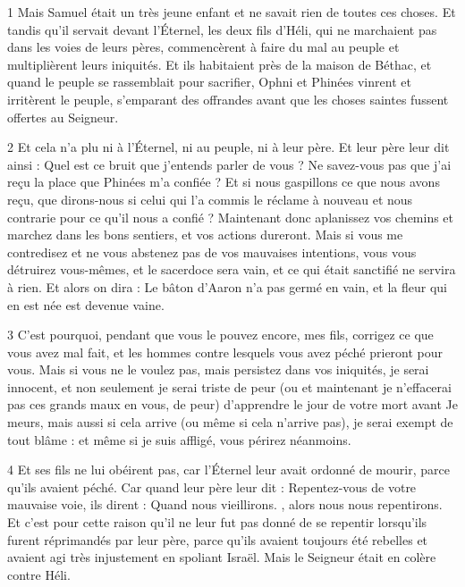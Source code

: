 
\par 1 Mais Samuel était un très jeune enfant et ne savait rien de toutes ces choses. Et tandis qu'il servait devant l'Éternel, les deux fils d'Héli, qui ne marchaient pas dans les voies de leurs pères, commencèrent à faire du mal au peuple et multiplièrent leurs iniquités. Et ils habitaient près de la maison de Béthac, et quand le peuple se rassemblait pour sacrifier, Ophni et Phinées vinrent et irritèrent le peuple, s'emparant des offrandes avant que les choses saintes fussent offertes au Seigneur.

\par 2 Et cela n'a plu ni à l'Éternel, ni au peuple, ni à leur père. Et leur père leur dit ainsi : Quel est ce bruit que j'entends parler de vous ? Ne savez-vous pas que j'ai reçu la place que Phinées m'a confiée ? Et si nous gaspillons ce que nous avons reçu, que dirons-nous si celui qui l'a commis le réclame à nouveau et nous contrarie pour ce qu'il nous a confié ? Maintenant donc aplanissez vos chemins et marchez dans les bons sentiers, et vos actions dureront. Mais si vous me contredisez et ne vous abstenez pas de vos mauvaises intentions, vous vous détruirez vous-mêmes, et le sacerdoce sera vain, et ce qui était sanctifié ne servira à rien. Et alors on dira : Le bâton d’Aaron n’a pas germé en vain, et la fleur qui en est née est devenue vaine.

\par 3 C'est pourquoi, pendant que vous le pouvez encore, mes fils, corrigez ce que vous avez mal fait, et les hommes contre lesquels vous avez péché prieront pour vous. Mais si vous ne le voulez pas, mais persistez dans vos iniquités, je serai innocent, et non seulement je serai triste de peur (ou et maintenant je n'effacerai pas ces grands maux en vous, de peur) d'apprendre le jour de votre mort avant Je meurs, mais aussi si cela arrive (ou même si cela n'arrive pas), je serai exempt de tout blâme : et même si je suis affligé, vous périrez néanmoins.

\par 4 Et ses fils ne lui obéirent pas, car l'Éternel leur avait ordonné de mourir, parce qu'ils avaient péché. Car quand leur père leur dit : Repentez-vous de votre mauvaise voie, ils dirent : Quand nous vieillirons. , alors nous nous repentirons. Et c'est pour cette raison qu'il ne leur fut pas donné de se repentir lorsqu'ils furent réprimandés par leur père, parce qu'ils avaient toujours été rebelles et avaient agi très injustement en spoliant Israël. Mais le Seigneur était en colère contre Héli.

